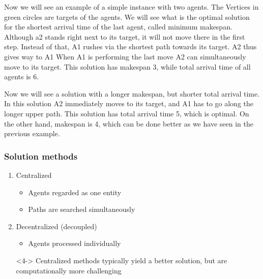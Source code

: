 \documentclass[aspectratio=169,t,xcolor=table]{beamer}
\begin{document}
\begin{frame}
{		Now we will see an example of a simple instance with two agents.
		The Vertices in green circles are targets of the agents.
		We will see what is the optimal solution for the shortest arrival time of the last agent, called minimum makespan.
		Although a2 stands right next to its target, it will not move there in the first step.
		Instead of that, A1 rushes via the shortest path towards its target.
		A2 thus gives way to A1
		When A1 is performing the last move A2 can simultaneously  move to its target.
		This solution has makespan 3, while total arrival time of all agents is 6.

		Now we will see a solution with a longer makespan, but shorter total arrival time.
		In this solution A2 immediately moves to its target, and A1 has to go along the longer upper path.
		This solution has total arrival time 5, which is optimal.
		On the other hand, makespan is 4, which can be done better as we have seen in the previous example.


	}
\end{frame}
\begin{frame}
\frametitle{Solution methods}
\begin{enumerate}
    \item<1-> Centralized
        \begin{itemize}
        \item<2-> Agents regarded as one entity
        \item<2-> Paths are searched simultaneously
        \end{itemize}
        \vspace{20pt}
	\item<1-> Decentralized (decoupled)
        \begin{itemize}
        \item<3-> Agents processed individually 
        \end{itemize}
	\item[]<4-> Centralized methods typically yield a better solution, but are computationally more challenging
\end{enumerate}

\end{frame}
\end{document}
